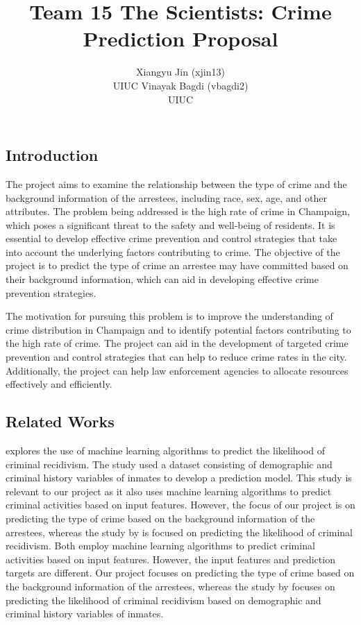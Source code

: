 \documentclass[
  article]{jss}
\author{Xiangyu Jin (xjin13)\\UIUC \And Vinayak Bagdi (vbagdi2)\\UIUC}
\title{Team 15 The Scientists: Crime Prediction Proposal}
\begin{document}
\maketitle
\hypertarget{introduction}{%
\subsection{Introduction}\label{introduction}}

The project aims to examine the relationship between the type of crime
and the background information of the arrestees, including race, sex,
age, and other attributes. The problem being addressed is the high rate
of crime in Champaign, which poses a significant threat to the safety
and well-being of residents. It is essential to develop effective crime
prevention and control strategies that take into account the underlying
factors contributing to crime. The objective of the project is to
predict the type of crime an arrestee may have committed based on their
background information, which can aid in developing effective crime
prevention strategies.

The motivation for pursuing this problem is to improve the understanding
of crime distribution in Champaign and to identify potential factors
contributing to the high rate of crime. The project can aid in the
development of targeted crime prevention and control strategies that can
help to reduce crime rates in the city. Additionally, the project can
help law enforcement agencies to allocate resources effectively and
efficiently.

\hypertarget{related-works}{%
\subsection{Related Works}\label{related-works}}

\citet{Travaini2022} explores the use of machine learning algorithms to
predict the likelihood of criminal recidivism. The study used a dataset
consisting of demographic and criminal history variables of inmates to
develop a prediction model. This study is relevant to our project as it
also uses machine learning algorithms to predict criminal activities
based on input features. However, the focus of our project is on
predicting the type of crime based on the background information of the
arrestees, whereas the study by \citet{Travaini2022} is focused on
predicting the likelihood of criminal recidivism. Both employ machine
learning algorithms to predict criminal activities based on input
features. However, the input features and prediction targets are
different. Our project focuses on predicting the type of crime based on
the background information of the arrestees, whereas the study by
\citet{Travaini2022} focuses on predicting the likelihood of criminal
recidivism based on demographic and criminal history variables of
inmates.
\end{document}
